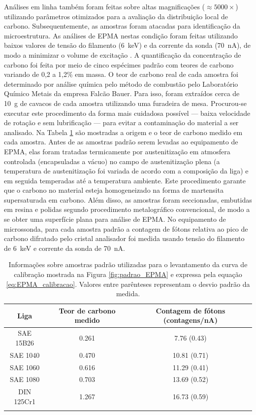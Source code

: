 Análises em linha também foram feitas sobre altas magnificações ($\approx 5000 \times$) utilizando parâmetros otimizados para a avaliação da distribuição local de carbono. Subsequentemente, as amostras foram atacadas para identificação da microestrutura. As análises de EPMA nestas condição foram feitas utilizando baixos valores de tensão do filamento (\SI{6}{keV}) e da corrente da sonda (\SI{70}{nA}), de modo a minimizar o volume de excitação \cite{Toji2015}. A quantificação da concentração de carbono foi feita por meio de cinco espécimes padrão com teores de carbono variando de 0,2 a 1,2\% em massa. O teor de carbono real de cada amostra foi determinado por análise química pelo método de combustão pelo Laboratório Químico Metais da empresa Falcão Bauer. Para isso, foram extraídos cerca de \SI{10}{g} de cavacos de cada amostra utilizando uma furadeira de mesa. Procurou-se executar este procedimento da forma mais cuidadosa possível --- baixa velocidade de rotação e sem lubrificação --- para evitar a contaminação do material a ser analisado. Na Tabela \ref{tab:comp_padrao_EPMA} são mostradas a origem e o teor de carbono medido em cada amostra. Antes de as amostras padrão serem levadas ao equipamento de EPMA, elas foram tratadas termicamente por austenitização em atmosfera controlada (encapsuladas a vácuo) no campo de austenitização plena (a temperatura de austenitização foi variada de acordo com a composição da liga) e em seguida temperadas até a temperatura ambiente. Este procedimento garante que o carbono no material esteja homogeneizado na forma de martensita supersaturada em carbono. Além disso, as amostras foram seccionadas, embutidas em resina e polidas segundo procedimento metalográfico convencional, de modo a se obter uma superfície plana para análise de EPMA. No equipamento de microssonda, para cada amostra padrão a contagem de fótons relativa ao pico de carbono difratado pelo cristal analisador foi medida usando tensão do filamento de \SI{6}{keV} e corrente da sonda de \SI{70}{nA}.

\begin{table}
  \caption{Informações sobre amostras padrão utilizadas para o levantamento da curva de calibração mostrada na Figura \ref{fig:padrao_EPMA} e expressa pela equação \ref{eq:EPMA_calibracao}. Valores entre parênteses representam o desvio padrão da medida.}
  \begin{tabular}{c c c}
    \thickhline
    \textbf{Liga} & \textbf{Teor de carbono medido} & \textbf{Contagem de fótons (contagens/nA)} \\
    \hline
    SAE 15B26 & 0.261 & 7.76 (0.43) \\
    SAE 1040 & 0.470 & 10.81 (0.71) \\
    SAE 1060 & 0.616 & 11.29 (0.41) \\
    SAE 1080 & 0.703 & 13.69 (0.52) \\
    DIN 125Cr1 & 1.267 & 16.73 (0.59) \\
    \thickhline
  \end{tabular}
  \label{tab:comp_padrao_EPMA}
\end{table}

